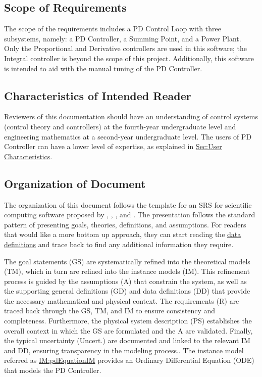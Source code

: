 \documentclass[12pt]{article}
\begin{document}
\subsection{Scope of Requirements}
\label{Sec:ReqsScope}
The scope of the requirements includes a PD Control Loop with three subsystems, namely: a PD Controller, a Summing Point, and a Power Plant. Only the Proportional and Derivative controllers are used in this software; the Integral controller is beyond the scope of this project. Additionally, this software is intended to aid with the manual tuning of the PD Controller.

\subsection{Characteristics of Intended Reader}
\label{Sec:ReaderChars}
Reviewers of this documentation should have an understanding of control systems (control theory and controllers) at the fourth-year undergraduate level and engineering mathematics at a second-year undergraduate level. The users of PD Controller can have a lower level of expertise, as explained in \hyperref[Sec:UserChars]{Sec:User Characteristics}.

\subsection{Organization of Document}
\label{Sec:DocOrg}
The organization of this document follows the template for an SRS for scientific computing software proposed by \cite{koothoor2013}, \cite{smithLai2005}, \cite{smithEtAl2007}, and \cite{smithKoothoor2016}. The presentation follows the standard pattern of presenting goals, theories, definitions, and assumptions. For readers that would like a more bottom up approach, they can start reading the \hyperref[Sec:IMs]{data definitions} and trace back to find any additional information they require.

The goal statements (GS) are systematically refined into the theoretical models (TM), which in turn are refined into the instance models (IM). This refinement process is guided by the assumptions (A) that constrain the system, as well as the supporting general definitions (GD) and data definitions (DD) that provide the necessary mathematical and physical context. The requirements (R) are traced back through the GS, TM, and IM to ensure consistency and completeness. Furthermore, the physical system description (PS) establishes the overall context in which the GS are formulated and the A are validated. Finally, the typical uncertainty (Uncert.) are documented and linked to the relevant IM and DD, ensuring transparency in the modeling process.. The instance model referred as \hyperref[IM:pdEquationIM]{IM:pdEquationIM} provides an Ordinary Differential Equation (ODE) that models the PD Controller.
\end{document}

